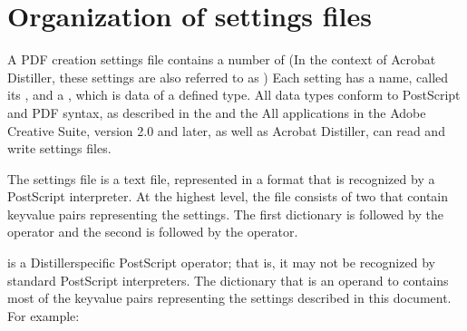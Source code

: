 \documentclass[letterpaper,12pt,english,openany,oneside]{sphinxmanual}
\begin{document}
\section{Organization of settings files}
\label{\detokenize{index:organization-of-settings-files}}
A PDF creation settings file contains a number of  (In the context of Acrobat Distiller, these settings are also referred to as  ) Each setting has a name, called its  , and a  , which is data of a defined type. All data types conform to PostScript and PDF syntax, as described in the  and the  All applications in the Adobe Creative Suite, version 2.0 and later, as well as Acrobat Distiller, can read and write settings files.

The settings file is a text file, represented in a format that is recognized by a PostScript interpreter. At the highest level, the file consists of two  that contain key\sphinxhyphen{}value pairs representing the settings. The first dictionary is followed by the  operator and the second is followed by the  operator.

\begin{sphinxVerbatim}[commandchars=\\\{\}]
      
 
      
 
\end{sphinxVerbatim}

 is a Distiller\sphinxhyphen{}specific PostScript operator; that is, it may not be recognized by standard PostScript interpreters. The dictionary that is an operand to  contains most of the key\sphinxhyphen{}value pairs representing the settings described in this document. For example:

\begin{sphinxVerbatim}[commandchars=\\\{\}]
          
          
          
          
 
\end{sphinxVerbatim}
\end{document}
